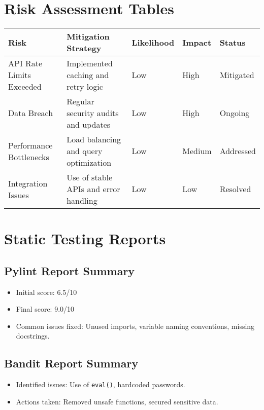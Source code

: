 \documentclass[12pt,a4paper]{report}
\begin{document}
\section{Risk Assessment Tables}
\begin{longtable}{p{4cm} p{6cm} p{2cm} p{2cm} p{2cm}}
\toprule
\textbf{Risk} & \textbf{Mitigation Strategy} & \textbf{Likelihood} & \textbf{Impact} & \textbf{Status} \\
\midrule
API Rate Limits Exceeded & Implemented caching and retry logic & Low & High & Mitigated \\
Data Breach & Regular security audits and updates & Low & High & Ongoing \\
Performance Bottlenecks & Load balancing and query optimization & Low & Medium & Addressed \\
Integration Issues & Use of stable APIs and error handling & Low & Low & Resolved \\
\bottomrule
\end{longtable}

\section{Static Testing Reports}
\subsection{Pylint Report Summary}
\begin{itemize}
    \item Initial score: 6.5/10
    \item Final score: 9.0/10
    \item Common issues fixed: Unused imports, variable naming conventions, missing docstrings.
\end{itemize}

\subsection{Bandit Report Summary}
\begin{itemize}
    \item Identified issues: Use of \texttt{eval()}, hardcoded passwords.
    \item Actions taken: Removed unsafe functions, secured sensitive data.
\end{itemize}
\end{document}
